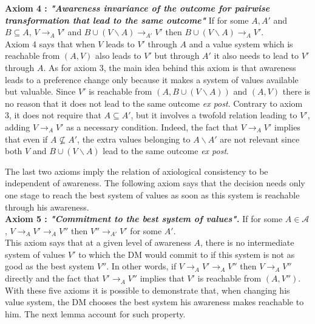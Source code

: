 \documentclass[11pt]{article}
\begin{document}
\noindent
\textbf{Axiom 4 : \textit{"Awareness invariance of the outcome for pairwise transformation that lead to the same outcome"}} If for some $A,A'$ and $B\subseteq A$, $V\rightarrow_{A}V'$ and $B\cup (V\backslash A)\rightarrow_{A'} V'$ then $B\cup (V\backslash A)\rightarrow_{A}V'$. 
\\
  
  
  Axiom 4 says that when $V$ leads to $V'$ through $A$ and a value system which is reachable from $(A,V)$ also leads to $V'$ but through $A'$ it also needs to lead to $V'$ through $A$. As for axiom 3, the main idea behind this axiom is that awareness leads to a preference change only because it makes a system of values available but valuable. Since $V'$ is reachable from $(A,B\cup (V\backslash A))$ and $(A,V)$ there is no reason that it does not lead to the same outcome \textit{ex post}. Contrary to axiom 3, it does not require that $A\subseteq A'$, but it involves a twofold relation leading to $V'$, adding $V\rightarrow_{A}V'$ as a necessary condition. Indeed, the fact that $V\rightarrow_{A}V'$ implies that even if $A\not \subseteq A'$, the extra values belonging to $A\backslash A'$ are not relevant since both $V$ and  $B\cup (V\backslash A)$ lead to the same outcome \textit{ex post}.
  
  The last two axioms imply the relation of axiological consistency to be independent of awareness. The following axiom says that the decision needs only one stage to reach the best system of values as soon as this system is reachable through his awareness. 
\\




\noindent
\textbf{Axiom 5 : \textit{"Commitment to the best system of values".}} If for some $A\in \mathcal{A}$,  $V\rightarrow_{A}V'\rightarrow_{A}V''$ then $V''\rightarrow_{A'}V'$ for some $A'$. 
\\


This axiom says that at a given level of awareness $A$, there is no intermediate system of values $V'$ to which the DM would commit to if this system is not as good as the best system $V''$. In other words, if  $V\rightarrow_{A}V'\rightarrow_{A}V''$ then $V\rightarrow_{A}V''$ directly and the fact that $V'\rightarrow_{A}V''$ implies that $V'$ is reachable from $(A,V'')$. 
\\

With these five axioms it is possible to demonstrate that, when changing his value system, the DM chooses the best system his awareness makes reachable to him. The next lemma account for such property. 
\\
\end{document}
